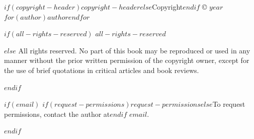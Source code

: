 \vspace*{\dimexpr 0.07\paperheight - 1in - \voffset - \topmargin - \headheight - \headsep\relax}

\begin{singlespacing}

{\setlength{\fboxsep}{8pt}%
\noindent{}\par}

\vspace*{\fill}

\noindent $if(copyright-header)$$copyright-header$$else$Copyright$endif$ © $year$ $for(author)$$author$$endfor$ \par

\vspace{0.4cm}

$if(all-rights-reserved)$
\noindent $all-rights-reserved$ \par
$else$
\noindent All rights reserved. No part of this book may be reproduced
or used in any manner without the prior written permission of the copyright owner,
except for the use of brief quotations in critical articles and book reviews. \par
$endif$

$if(email)$
\vspace{0.4cm}
\noindent $if(request-permissions)$$request-permissions$$else$To request permissions, contact the author at$endif$ $email$. \par
$endif$


\end{singlespacing}
